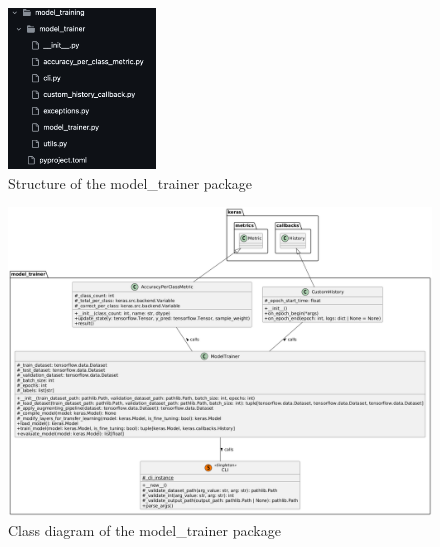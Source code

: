 \documentclass{BachelorBUI}
\begin{document}
        \begin{figure}[h]
            \centering
            \includegraphics[width=0.35\textwidth]{model_trainer_package_github.png}
            \caption{\centering Structure of the model\_trainer package}
            \label{fig:model-trainer-package-github}
        \end{figure}

        \begin{figure}[h]
            \centering
            \includegraphics[width=\textwidth]{class_diagram_model_trainer.png}
            \caption{\centering Class diagram of the model\_trainer package}
            \label{fig:classs-diagram-model-trainer-package}
        \end{figure}
\end{document}
